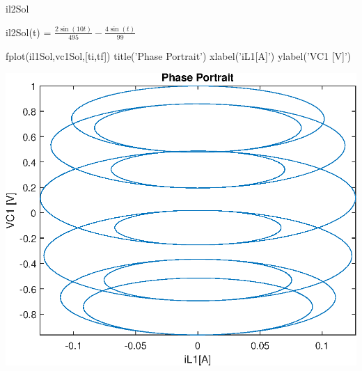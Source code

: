 \documentclass[10pt,a4paper]{article} %
\begin{document}

\begin{matlabcode}
	il2Sol
\end{matlabcode}
\begin{matlabsymbolicoutput}
	il2Sol(t) = 
	$\displaystyle \frac{2 \sin \left(10 t\right)}{495}-\frac{4 \sin \left(t\right)}{99}$
\end{matlabsymbolicoutput}


\vspace{1em}

\begin{matlabcode}
	fplot(il1Sol,vc1Sol,[ti,tf])
	title('Phase Portrait')
	xlabel('iL1[A]')
	ylabel('VC1 [V]')
\end{matlabcode}
\begin{center}
	\includegraphics[width=\maxwidth{56.196688409433015em}]{figure_0_10}
\end{center}
\end{document}
